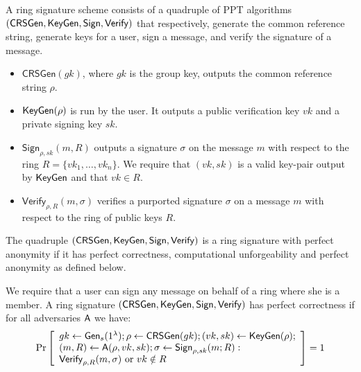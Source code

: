 \begin{definition}
A ring signature scheme consists of a quadruple of
PPT algorithms $(\mathsf{CRSGen}, \mathsf{KeyGen}, \mathsf{Sign}, \mathsf{Verify})$ that respectively, generate the common
reference string, generate keys for a user, sign a message, and verify the signature of a
message.
\begin{itemize}
\item $\mathsf{CRSGen}(gk)$, where $gk$ is the group key, outputs the common reference
string $\rho$.
\item $\mathsf{KeyGen}(\rho)$ is run by the user. It outputs a public verification key $vk$ and a private
signing key $sk$.
\item $\mathsf{Sign}_{\rho,sk}(m, R)$ outputs a signature $\sigma$ on the message $m$ with respect to the ring
$R = \{vk_1,\ldots,vk_n\}$. We require that $(vk, sk)$ is a valid key-pair output by $\mathsf{KeyGen}$
and that $vk \in R$.
\item $\mathsf{Verify}_{\rho,R}(m, \sigma)$ verifies a purported signature $\sigma$ on a message $m$ with respect to
the ring of public keys $R$.
\end{itemize}
The quadruple $(\mathsf{CRSGen}, \mathsf{KeyGen}, \mathsf{Sign}, \mathsf{Verify})$ is a ring signature with perfect
anonymity if it has perfect correctness, computational unforgeability and perfect
anonymity as defined below.
\end{definition}

\begin{definition}
We require that a user can sign any message on behalf of a ring where she is a member. A ring signature $(\mathsf{CRSGen},\allowbreak \mathsf{KeyGen}, \mathsf{Sign}, \mathsf{Verify})$
has perfect correctness if for all adversaries $\mathsf{A}$ we have:
$$
\Pr\left[\begin{array}{l}
gk\gets\mathsf{Gen}_s(1^\lambda);\rho\gets\mathsf{CRSGen}(gk);(vk,sk)\gets\mathsf{KeyGen}(\rho);\\
(m,R)\gets\mathsf{A}(\rho,vk,sk);\sigma\gets\mathsf{Sign}_{\rho,sk}(m;R):\\
\mathsf{Verify}_{\rho,R}(m,\sigma)\text{ or }vk\notin R
\end{array}\right]=1
$$
\end{definition}

